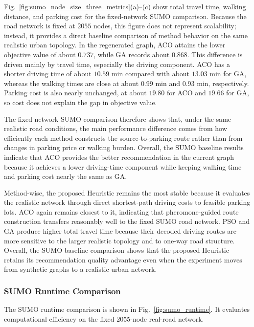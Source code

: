 Fig.~\ref{fig:sumo_node_size_three_metrics}(a)--(c) show total travel time, walking distance, and parking cost for the fixed-network SUMO comparison. Because the road network is fixed at \(2055\) nodes, this figure does not represent scalability; instead, it provides a direct baseline comparison of method behavior on the same realistic urban topology. In the regenerated graph, ACO attains the lower objective value of about \(0.737\), while GA records about \(0.868\). This difference is driven mainly by travel time, especially the driving component. ACO has a shorter driving time of about \(10.59\) min compared with about \(13.03\) min for GA, whereas the walking times are close at about \(0.99\) min and \(0.93\) min, respectively. Parking cost is also nearly unchanged, at about \(19.80\) for ACO and \(19.66\) for GA, so cost does not explain the gap in objective value.

The fixed-network SUMO comparison therefore shows that, under the same realistic road conditions, the main performance difference comes from how efficiently each method constructs the source-to-parking route rather than from changes in parking price or walking burden. Overall, the SUMO baseline results indicate that ACO provides the better recommendation in the current graph because it achieves a lower driving-time component while keeping walking time and parking cost nearly the same as GA.

Method-wise, the proposed Heuristic remains the most stable because it evaluates the realistic network through direct shortest-path driving costs to feasible parking lots. ACO again remains closest to it, indicating that pheromone-guided route construction transfers reasonably well to the fixed SUMO road network. PSO and GA produce higher total travel time because their decoded driving routes are more sensitive to the larger realistic topology and to one-way road structure. Overall, the SUMO baseline comparison shows that the proposed Heuristic retains its recommendation quality advantage even when the experiment moves from synthetic graphs to a realistic urban network.

\subsubsection{SUMO Runtime Comparison}

The SUMO runtime comparison is shown in Fig.~\ref{fig:sumo_runtime}. It evaluates computational efficiency on the fixed \(2055\)-node real-road network.

